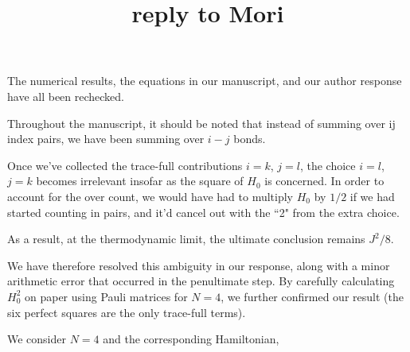\documentclass[showpacs,floatfix,superscriptaddress, onecolumn, nofootinbib, 10pt]{revtex4-2}
\title{reply to Mori}
\begin{document}
The numerical results, the equations in our manuscript, and our author response have all been rechecked. 

Throughout the manuscript, it should be noted that instead of summing over ij index pairs, we have been summing over $i-j$ bonds. 

Once we've collected the trace-full contributions $i=k$, $j=l$, the choice $i=l$, $j=k$ becomes irrelevant insofar as the square of $H_0$ is concerned. In order to account for the over count, we would have had to multiply $H_0$ by $1/2$ if we had started counting in pairs, and it'd cancel out with the ``2" from the extra choice. 

As a result, at the thermodynamic limit, the ultimate conclusion remains $J^2/8$.

We have therefore resolved this ambiguity in our response, along with a minor arithmetic error that occurred in the penultimate step. By carefully calculating $H_0^2$ on paper using Pauli matrices for $N=4$, we further confirmed our result (the six perfect squares are the only trace-full terms).

We consider $N=4$ and the corresponding Hamiltonian,
\end{document}
